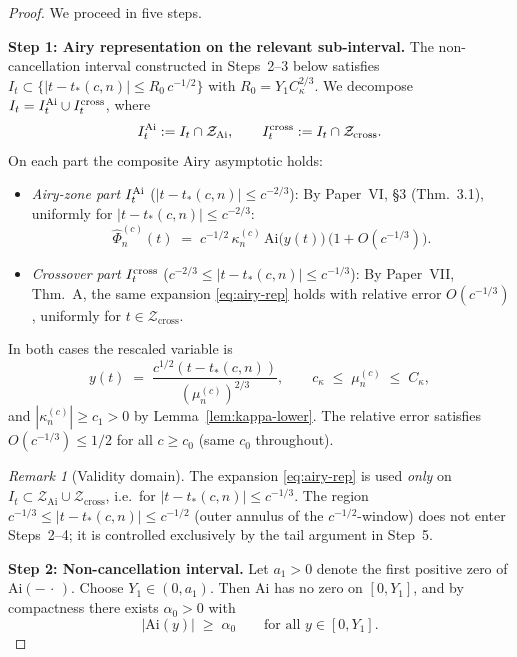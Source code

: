 \documentclass[12pt,a4paper]{amsart}
\theoremstyle{definition}
\theoremstyle{remark}
\newtheorem{remark}[theorem]{Remark}
\newcommand{\Phihat}{\widehat{\Phi}}
\newcommand{\Ai}{\mathrm{Ai}}
\newcommand{\Zcross}{\mathcal{Z}_{\mathrm{cross}}}
\newcommand{\Zai}{\mathcal{Z}_{\mathrm{Ai}}}
\newcommand{\tstar}{t_*(c,n)}
\begin{document}
\begin{proof}
We proceed in five steps.

\textbf{Step 1: Airy representation on the relevant sub-interval.}
The non-cancellation interval constructed in Steps~2--3 below
satisfies $I_t \subset \{|t - \tstar| \le R_0\,c^{-1/2}\}$
with $R_0 = Y_1 C_\kappa^{2/3}$.
We decompose $I_t = I_t^{\rm Ai} \cup I_t^{\rm cross}$,
where
\[
  I_t^{\rm Ai}   := I_t \cap \Zai,
  \qquad
  I_t^{\rm cross} := I_t \cap \Zcross.
\]
On each part the composite Airy asymptotic holds:
\begin{itemize}
\item \emph{Airy-zone part} $I_t^{\rm Ai}$
      ($|t-\tstar|\le c^{-2/3}$):
      By Paper~VI, \S3 (Thm.~3.1), uniformly for
      $|t-\tstar|\le c^{-2/3}$:
      \begin{equation}\label{eq:airy-rep}
        \Phihat_n^{(c)}(t)
        \;=\;
        c^{-1/2}\,\kappa_n^{(c)}\,
        \Ai\!\bigl(y(t)\bigr)\,
        \bigl(1 + O(c^{-1/3})\bigr).
      \end{equation}
\item \emph{Crossover part} $I_t^{\rm cross}$
      ($c^{-2/3}\le|t-\tstar|\le c^{-1/3}$):
      By Paper~VII, Thm.~A, the same expansion
      \eqref{eq:airy-rep} holds with relative error
      $O(c^{-1/3})$, uniformly for $t\in\Zcross$.
\end{itemize}
In both cases the rescaled variable is
\[
  y(t) \;=\; \frac{c^{1/2}(t - \tstar)}{(\mu_n^{(c)})^{2/3}},
  \qquad
  c_\kappa \;\le\; \mu_n^{(c)} \;\le\; C_\kappa,
\]
and $|\kappa_n^{(c)}| \ge c_1 > 0$ by
Lemma~\ref{lem:kappa-lower}.
The relative error satisfies $O(c^{-1/3})\le 1/2$
for all $c\ge c_0$ (same $c_0$ throughout).

\begin{remark}[Validity domain]
\label{rem:airy-validity}
The expansion \eqref{eq:airy-rep} is used
\emph{only} on $I_t \subset \Zai \cup \Zcross$,
i.e.\ for $|t-\tstar|\le c^{-1/3}$.
The region $c^{-1/3}\le|t-\tstar|\le c^{-1/2}$
(outer annulus of the $c^{-1/2}$-window)
does not enter Steps~2--4; it is controlled
exclusively by the tail argument in Step~5.
\end{remark}

\textbf{Step 2: Non-cancellation interval.}
Let $a_1 > 0$ denote the first positive zero of $\Ai(-\,\cdot\,)$.
Choose $Y_1 \in (0, a_1)$. Then $\Ai$ has no zero
on $[0, Y_1]$, and by compactness there exists
$\alpha_0 > 0$ with
\[
  |\Ai(y)| \;\ge\; \alpha_0
  \qquad \text{for all } y \in [0, Y_1].
\]


\end{proof}
\end{document}
